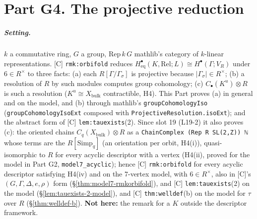 
\chapter{Part G4. The projective reduction}\label{ch:projred}

\paragraph{Setting.} $k$ a commutative ring, $G$ a group, $\mathrm{Rep}\,k\,G$ mathlib's category of $k$-linear
representations. [C] \texttt{rmk:orbifold} reduces $H^\bullet_{\mathrm{eq}}(K,\mathrm{Rel};L)\cong H^\bullet(\Gamma;V_R)$ under $6\in R^\times$ to
three facts: (a) each $R[\Gamma/\Gamma_\sigma]$ is projective because $|\Gamma_\sigma|\in R^\times$; (b) a resolution of $R$ by
such modules computes group cohomology; (c) $C_\bullet(K^u)\otimes R$ is such a resolution ($K^u\cong X_{\mathrm{bulk}}$
contractible, H4). This Part proves (a) in general and on the model, and (b) through mathlib's
\texttt{groupCohomologyIso} (\texttt{groupCohomologyIsoExt} composed with \texttt{ProjectiveResolution.isoExt}); and the
abstract form of [C] \texttt{lem:tauexists}(2). Since slot 19 (L19-2) it also proves (c): the oriented chains
$C_q(X_{\mathrm{bulk}})\otimes R$ as a \texttt{ChainComplex (Rep R SL(2,Z)) ℕ} whose terms are the $R[\mathrm{Simp}_q]$ (an
orientation per orbit, H4(i)), quasi-isomorphic to $R$ for every acyclic descriptor with a vertex (H4(ii), proved for the
model in Part G2, \texttt{model7\_acyclic}); hence [C] \texttt{rmk:orbifold} for every acyclic descriptor satisfying H4(iv) and
on the 7-vertex model, with $6\in R^\times$, also in [C]'s $(G,\Gamma,\Delta,e,\rho)$ form (\S\ref{thm:model7-rmkorbifold}), and
[C] \texttt{lem:tauexists}(2) on the model (\S\ref{lem:tauexists-2-model}), and [C] \texttt{thm:welldef}(b) on the model for $\tau$
over $R$ (\S\ref{thm:welldef-b}). \textbf{Not here:} the remark for a $K$ outside the descriptor framework.

